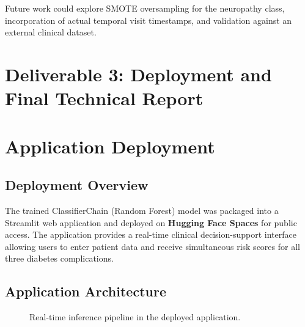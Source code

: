 \documentclass[12pt]{article}
\begin{document}
Future work could explore SMOTE oversampling for the neuropathy class, incorporation of
actual temporal visit timestamps, and validation against an external clinical dataset.

\newpage


\section*{Deliverable 3: Deployment and Final Technical Report}


\section{Application Deployment}

\subsection{Deployment Overview}

The trained ClassifierChain (Random Forest) model was packaged into a Streamlit web
application and deployed on \textbf{Hugging Face Spaces} for public access.
The application provides a real-time clinical decision-support interface allowing
users to enter patient data and receive simultaneous risk scores for all three
diabetes complications.



\subsection{Application Architecture}

\begin{figure}[H]
\centering
{}
\caption{Real-time inference pipeline in the deployed application.}
\label{fig:deploy_arch}
\end{figure}
\end{document}
